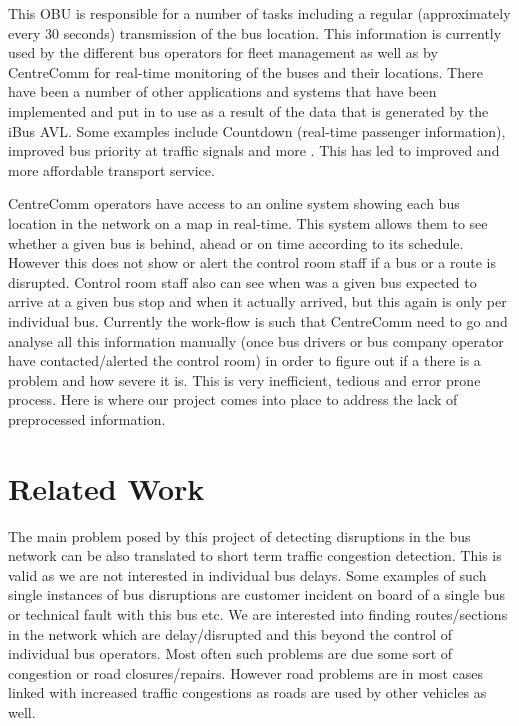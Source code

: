 This OBU is responsible for a number of tasks including a regular (approximately every 30 seconds) transmission of the bus location. This information is currently used by the different bus operators for fleet management as well as by CentreComm for real-time monitoring of the buses and their locations. There have been a number of other applications and systems that have been implemented and put in to use as a result of the data that is generated by the iBus AVL. Some examples include Countdown (real-time passenger information), improved bus priority at traffic signals and more \cite{Hounsell201276}. This has led to improved and more affordable transport service.

CentreComm operators have access to an online system showing each bus location in the network on a map in real-time. This system allows them to see whether a given bus is behind, ahead or on time according to its schedule. However this does not show or alert the control room staff if a bus or a route is disrupted. Control room staff also can see when was a given bus expected to arrive at a given bus stop and when it actually arrived, but this again is only per individual bus. Currently the work-flow is such that CentreComm need to go and analyse all this information manually (once bus drivers or bus company operator have contacted/alerted the control room) in order to figure out if a there is a problem and how severe it is. This is very inefficient, tedious and error prone process. Here is where our project comes into place to address the lack of preprocessed information.

\section{Related Work}
The main problem posed by this project of detecting disruptions in the bus network can be also translated to short term traffic congestion detection. This is valid as we are not interested in individual bus delays. Some examples of such single instances of bus disruptions are customer incident on board of a single bus or technical fault with this bus etc. We are interested into finding routes/sections in the network which are delay/disrupted and this beyond the control of individual bus operators. Most often such problems are due some sort of congestion or road closures/repairs. However road problems are in most cases linked with increased traffic congestions as roads are used by other vehicles as well.


